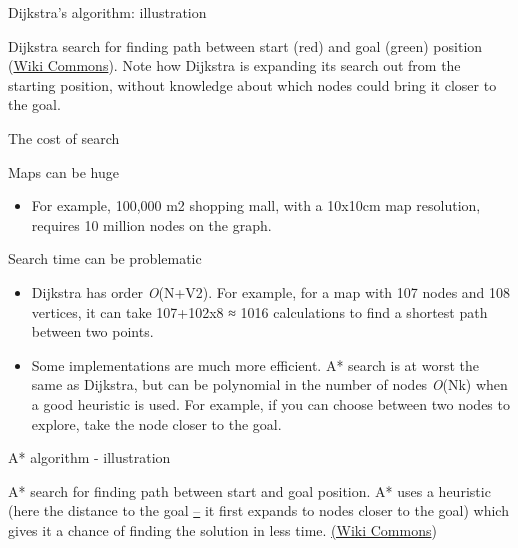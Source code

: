 \documentclass[compress]{beamer}
\begin{document}
\begin{frame}{Dijkstra's algorithm: illustration}

    \begin{center}
    \end{center}

Dijkstra search for finding path between start (red) and goal (green)
position (\href{http://en.wikipedia.org/wiki/Dijkstra's_algorithm}{Wiki
Commons}). Note how Dijkstra is expanding its search out from the
starting position, without knowledge about which nodes could bring it
closer to the goal.

\end{frame}

\begin{frame}{The cost of search}

Maps can be huge

\begin{itemize}
\item For example, 100,000 m2 shopping mall, with a 10x10cm map
  resolution, requires 10 million nodes on the graph.
\end{itemize}

Search time can be problematic

\begin{itemize}
\item Dijkstra has order \emph{O}(N+V2). For example, for a map with 107
  nodes and 108 vertices, it can take 107+102x8 ≈ 1016 calculations to
  find a shortest path between two points.
\item Some implementations are much more efficient. A* search is at worst
  the same as Dijkstra, but can be polynomial in the number of nodes
  \emph{O}(Nk) when a good heuristic is used. For example, if you can
  choose between two nodes to explore, take the node closer to the goal.
\end{itemize}

\end{frame}

\begin{frame}{A* algorithm - illustration}

    \begin{center}
    \end{center}

A* search for finding path between start and goal position. A* uses a
heuristic (here the distance to the goal
\href{http://en.wikipedia.org/wiki/A*_search_algorithm}{--} it first
expands to nodes closer to the goal) which gives it a chance of finding
the solution in less time.
\href{http://en.wikipedia.org/wiki/A*_search_algorithm}{(Wiki Commons})

\end{frame}
\end{document}
